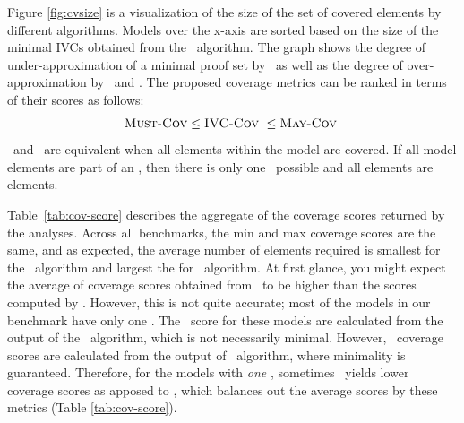 Figure \ref{fig:cvsize} is a visualization of the size of the set of covered elements by different algorithms. Models over the x-axis are sorted based on the size of the minimal IVCs obtained from the \ucbfalg\ algorithm.  The graph shows the degree of under-approximation of a minimal proof set by \mustcov\ as well as the degree of over-approximation by \ucalg\ and \maycov.  The proposed coverage metrics can be ranked in terms of their scores as follows:
$$\mustcov \leq \ivccov\ \leq \maycov\ $$
\ivccov\ and \mustcov\ are equivalent when all elements within the model are covered.  If all model elements are part of an \mivc, then there is only one \mivc\ possible and all elements are \must elements.





Table~\ref{tab:cov-score} describes the aggregate of the coverage scores returned by the analyses.  Across all benchmarks, the min and max coverage scores are the same, and as expected, the average number of elements required is smallest for the \mustalg\ algorithm and largest the for \ucalg\ algorithm.
At first glance, you might expect the average of coverage scores obtained from \maycov\ to be higher than the scores computed by \ivccov . However, this is not quite accurate; most of the models in our benchmark have only one \mivc . The \ivccov\ score for these models are calculated from the output of the \ucalg\ algorithm, which is not necessarily minimal. However, \maycov\ coverage scores are calculated from the output of \aivcalg\ algorithm, where minimality is guaranteed. Therefore, for the models with \emph{one} \mivc , sometimes \maycov\ yields lower coverage scores as apposed to \ivccov , which balances out the average scores by these metrics (Table \ref{tab:cov-score}).



